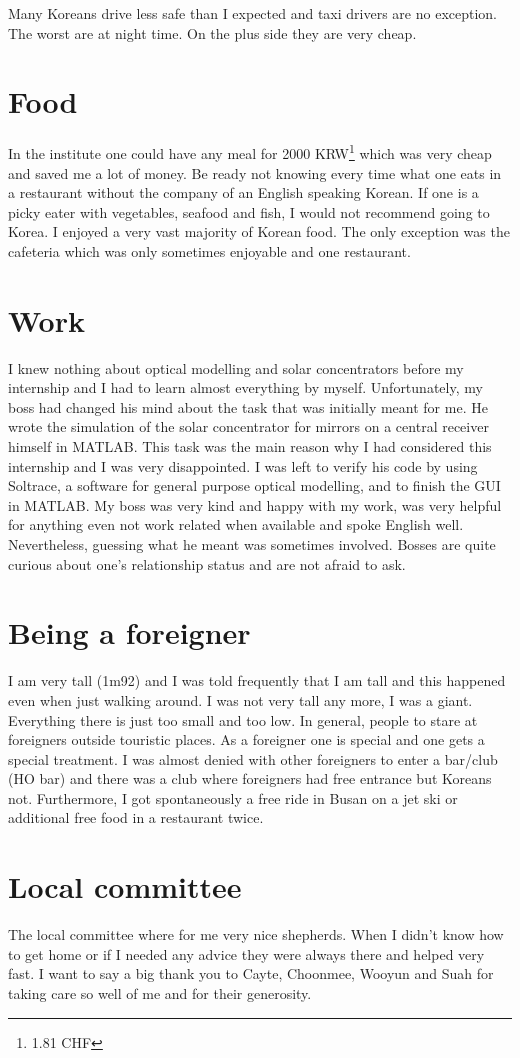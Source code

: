 Many Koreans drive less safe than I expected and taxi drivers are no exception. The worst are at night time. On the plus side they are very cheap.
\section*{Food}
In the institute one could have any meal for 2000 KRW\footnote{1.81 CHF} which was very cheap and saved me a lot of money. Be ready not knowing every time what one eats in a restaurant without the company of an English speaking Korean. If one is a picky eater with vegetables, seafood and fish, I would not recommend going to Korea. I enjoyed a very vast majority of Korean food. The only exception was the cafeteria which was only sometimes enjoyable and one restaurant.
\section*{Work}
I knew nothing about optical modelling and solar concentrators before my internship and I had to learn almost everything by myself. Unfortunately, my boss had changed his mind about the task that was initially meant for me. He wrote the simulation of the solar concentrator for mirrors on a central receiver himself in MATLAB. This task was the main reason why I had considered this internship and I was very disappointed. I was left to verify his code by using Soltrace, a software for general purpose optical modelling, and to finish the GUI in MATLAB. My boss was very kind and happy with my work, was very helpful for anything even not work related when available and spoke English well. Nevertheless, guessing what he meant was sometimes involved. Bosses are quite curious about one's relationship status and are not afraid to ask.
\section*{Being a foreigner}
I am very tall (1m92) and I was told frequently that I am tall and this happened even when just walking around. I was not very tall any more, I was a giant. Everything there is just too small and too low. 
In general, people to stare at foreigners outside touristic places. As a foreigner one is special and one gets a special treatment. I was almost denied with other foreigners to enter a bar/club (HO bar) and there was a club where foreigners had free entrance but Koreans not. Furthermore, I got spontaneously a free ride in Busan on a jet ski or additional free food in a restaurant twice.
\section*{Local committee}
The local committee where for me very nice shepherds. When I didn't know how to get home or if I needed any advice they were always there and helped very fast. I want to say a big thank you to Cayte, Choonmee, Wooyun and Suah for taking care so well of me and for their generosity.

